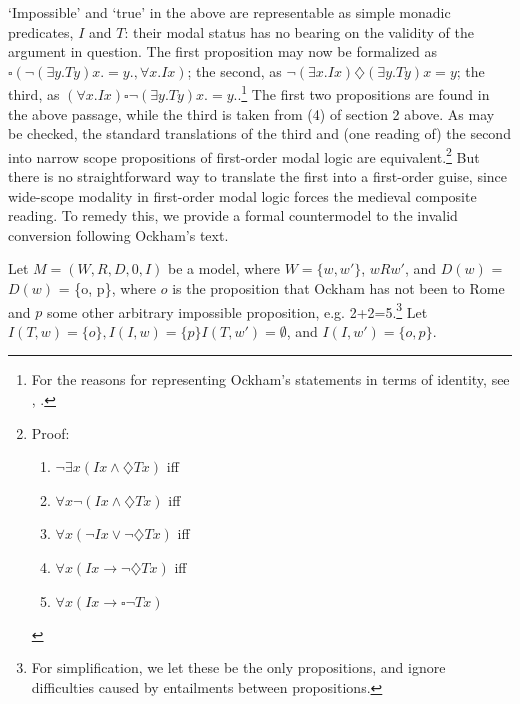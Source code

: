 \documentclass[a4paper]{article}
\begin{document}
`Impossible' and `true' in the above are representable as simple monadic predicates, $I$ and $T$: their modal status has no bearing on the validity of the argument in question. The first proposition may now be formalized as $\square(\neg (\exists y.Ty)x. = y., \forall x.Ix)$; the second, as $\neg (\exists x.Ix)\diamondsuit (\exists y.Ty)x=y$; the third, as $(\forall x.Ix)\square \neg (\exists y.Ty)x.=y.$.\footnote{For the reasons for representing Ockham's statements in terms of identity, see \cite{Klima1999}, \cite{Klima2008a}.} The first two propositions are found in the above passage, while the third is taken from (4) of section 2 above. As may be checked, the standard translations of the third and (one reading of) the second into narrow scope propositions of first-order modal logic are equivalent.\footnote{Proof: \begin{enumerate}
		\item $\neg\exists x(Ix \wedge \diamondsuit Tx)$ iff
		\item $\forall x \neg(Ix \wedge \diamondsuit Tx)$ iff
		\item $\forall x (\neg Ix \vee \neg\diamondsuit Tx)$ iff
		\item $\forall x (Ix \rightarrow \neg \diamondsuit Tx)$ iff
		\item $\forall x (Ix \rightarrow \square \neg Tx)$
	\end{enumerate}} 
But there is no straightforward way to translate the first into a first-order guise, since wide-scope modality in first-order modal logic forces the medieval composite reading. To remedy this, we provide a formal countermodel to the invalid conversion following Ockham's text.

Let $M = (W, R, D, 0, I)$ be a model, where $W = \{w, w'\}$, $wRw'$, and $D(w)$ = $D(w)$ = \{o, p\}, where $o$ is the proposition that Ockham has not been to Rome and $p$ some other arbitrary impossible proposition, e.g. 2+2=5.\footnote{For simplification, we let these be the only propositions, and ignore difficulties caused by entailments between propositions.} Let $I(T, w) = \{o\}, I(I, w) = \{p\} I(T, w') = \emptyset$, and $I(I, w') = \{o, p\}$. 
\end{document}
